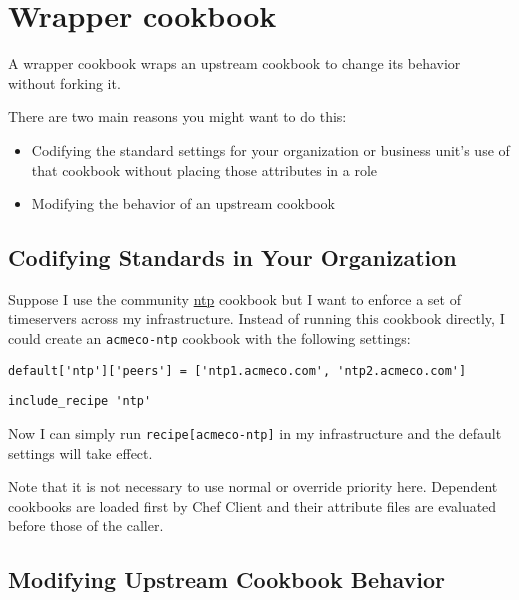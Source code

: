 \section{Wrapper cookbook}
\label{sec:tat-wrapper-cookbook}

A wrapper cookbook wraps an upstream cookbook to change its behavior without forking it.

There are two main reasons you might want to do this:

\begin{itemize}
  \item Codifying the standard settings for your organization or business unit’s use of that cookbook without placing those attributes in a role
  \item Modifying the behavior of an upstream cookbook
\end{itemize}


\subsection{Codifying Standards in Your Organization}

Suppose I use the community \href{https://supermarket.getchef.com/cookbooks/ntp}{ntp} cookbook but I want to enforce a set of timeservers across my infrastructure. Instead of running this cookbook directly, I could create an \lstinline!acmeco-ntp! cookbook with the following settings:

\begin{lstlisting}[label=lst:wrapper-cookbook1,caption=acmeco-ntp/attributes/default.rb]
default['ntp']['peers'] = ['ntp1.acmeco.com', 'ntp2.acmeco.com']
\end{lstlisting}

\begin{lstlisting}[label=lst:wrapper-cookbook2,caption=acmeco-ntp/recipes/default.rb]
include_recipe 'ntp'
\end{lstlisting}

Now I can simply run \lstinline!recipe[acmeco-ntp]! in my infrastructure and the default settings will take effect.

Note that it is not necessary to use normal or override priority here. Dependent cookbooks are loaded first by Chef Client and their attribute files are evaluated before those of the caller.


\subsection{Modifying Upstream Cookbook Behavior}

